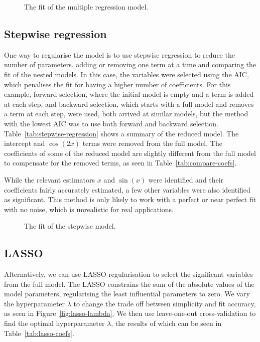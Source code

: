 \begin{figure}[htbp]
	\centering
	
	\caption{The fit of the multiple regression model.}
	\label{fig:multiple-regression-fit}
\end{figure}

\subsection{Stepwise regression}

One way to regularise the model is to use stepwise regression to reduce the number of parameters.
 adding or removing one term at a time and comparing the fit of the nested models.
In this case, the variables were selected using the \ac{AIC}, which penalises the fit for having a higher number of coefficients.
For this example, forward selection, where the initial model is empty and a term is added at each step, and backward selection, which starts with a full model and removes a term at each step, were used, both arrived at similar models, but the method with the lowest \ac{AIC} was to use both forward and backward selection.
Table~\ref{tab:stepwise-regression} shows a summary of the reduced model.
The intercept and \(\cos(2x)\) terms were removed from the full model.
The coefficients of some of the reduced model are slightly different from the full model to compensate for the removed terms, as seen in Table~\ref{tab:compare-coefs}.

While the relevant estimators \(x\) and \(\sin(x)\) were identified and their coefficients fairly accurately estimated, a few other variables were also identified as significant.
This method is only likely to work with a perfect or near perfect fit with no noise, which is unrealistic for real applications.

\begin{figure}[htbp]
	\centering
	
	\caption{The fit of the stepwise model.}
	\label{fig:stepwise-regression-fit}
\end{figure}

\subsection{LASSO}

Alternatively, we can use \ac{LASSO} regularisation to select the significant variables from the full model.
The \ac{LASSO} constrains the sum of the absolute values of the model parameters, regularising the least influential parameters to zero.
We vary the hyperparameter \(\lambda\) to change the trade off between simplicity and fit accuracy, as seen in Figure~\ref{fig:lasso-lambda}.
We then use leave-one-out cross-validation to find the optimal hyperparameter \(\lambda\), the results of which can be seen in Table~\ref{tab:lasso-coefs}.

